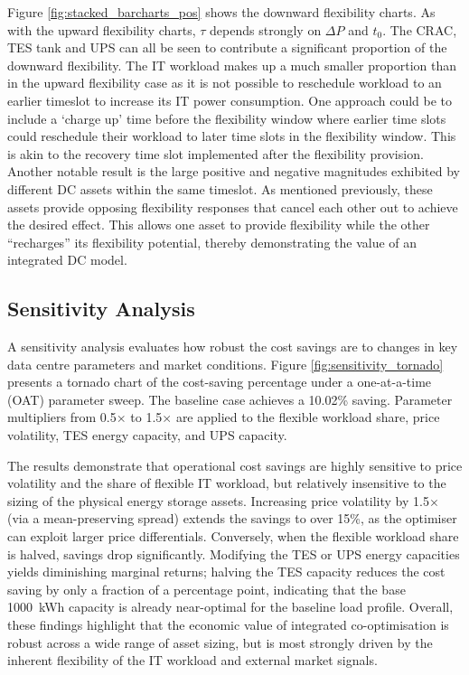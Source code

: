 \documentclass[lettersize,journal]{IEEEtran}
\newcommand{\rev}[1]{\textcolor{blue!70!black}{#1}}
\begin{document}
Figure \ref{fig:stacked_barcharts_pos} shows the downward flexibility charts. As  with the upward flexibility charts, $\tau$ depends strongly on  $\Delta P$ and $t_0$. The CRAC, TES tank and UPS can all be seen to contribute a significant proportion of the downward flexibility. The IT workload makes up a much smaller proportion than in the upward flexibility case as it is not possible to reschedule workload to an earlier timeslot to increase its IT power consumption. One approach could be to include a `charge up' time before the flexibility window where earlier time slots could reschedule their workload to later time slots in the flexibility window. This is akin to the recovery time slot implemented after the flexibility provision. Another notable result is the large positive and negative magnitudes exhibited by different DC assets within the same timeslot. As mentioned previously, these assets provide opposing flexibility responses that cancel each other out to achieve the desired effect. This allows one asset to provide flexibility while the other ``recharges'' its flexibility potential, thereby demonstrating the value of an integrated DC model.

\subsection{\rev{Sensitivity Analysis}}\label{sec:sensitivity}
\rev{A sensitivity analysis evaluates how robust the cost savings are to changes in key data centre parameters and market conditions. Figure \ref{fig:sensitivity_tornado} presents a tornado chart of the cost-saving percentage under a one-at-a-time (OAT) parameter sweep. The baseline case achieves a 10.02\% saving. Parameter multipliers from 0.5$\times$ to 1.5$\times$ are applied to the flexible workload share, price volatility, TES energy capacity, and UPS capacity.}

\rev{The results demonstrate that operational cost savings are highly sensitive to price volatility and the share of flexible IT workload, but relatively insensitive to the sizing of the physical energy storage assets. Increasing price volatility by 1.5$\times$ (via a mean-preserving spread) extends the savings to over 15\%, as the optimiser can exploit larger price differentials. Conversely, when the flexible workload share is halved, savings drop significantly. Modifying the TES or UPS energy capacities yields diminishing marginal returns; halving the TES capacity reduces the cost saving by only a fraction of a percentage point, indicating that the base 1000~kWh capacity is already near-optimal for the baseline load profile. Overall, these findings highlight that the economic value of integrated co-optimisation is robust across a wide range of asset sizing, but is most strongly driven by the inherent flexibility of the IT workload and external market signals.}
\end{document}
